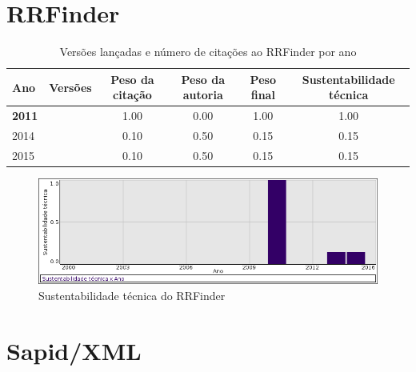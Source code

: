 \section{RRFinder}


\begin{table}[H]
\caption{Versões lançadas e número de citações ao RRFinder por ano}
\centering
\begin{tabular}{| l | c | c | c | c | c |}
  \hline
  Ano & Versões & Peso da citação & Peso da autoria & Peso final & Sustentabilidade técnica \\
  \hline
            {\bf 2011}
          &
          
          &
          1.00
          &
          0.00
          &
          1.00
          &
            {\color{blue} 1.00}
          \\
\hline
            2014
          &
          
          &
          0.10
          &
          0.50
          &
          0.15
          &
            {\color{red} 0.15}
          \\
\hline
            2015
          &
          
          &
          0.10
          &
          0.50
          &
          0.15
          &
            {\color{red} 0.15}
          \\
\hline
\end{tabular}
\end{table}

\begin{figure}[h]
  \center
  \includegraphics[scale=0.50]{imagens/softwares-charts/rrfinder.png}
  \caption{Sustentabilidade técnica do RRFinder}
\end{figure}


\section{Sapid/XML}


